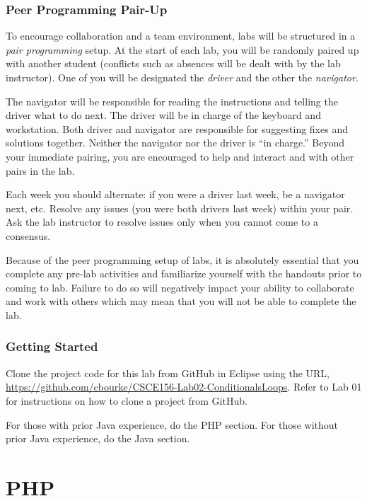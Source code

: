 \documentclass[12pt]{scrartcl}
\begin{document}
\section*{Peer Programming Pair-Up}

To encourage collaboration and a team environment, labs will be
structured in a \emph{pair programming} setup.  At the start of
each lab, you will be randomly paired up with another student 
(conflicts such as absences will be dealt with by the lab instructor).
One of you will be designated the \emph{driver} and the other
the \emph{navigator}.  

The navigator will be responsible for reading the instructions and
telling the driver what to do next.  The driver will be in charge of the
keyboard and workstation.  Both driver and navigator are responsible
for suggesting fixes and solutions together.  Neither the navigator
nor the driver is ``in charge.''  Beyond your immediate pairing, you
are encouraged to help and interact and with other pairs in the lab.

Each week you should alternate: if you were a driver last week, 
be a navigator next, etc.  Resolve any issues (you were both drivers
last week) within your pair.  Ask the lab instructor to resolve issues
only when you cannot come to a consensus.  

Because of the peer programming setup of labs, it is absolutely 
essential that you complete any pre-lab activities and familiarize
yourself with the handouts prior to coming to lab.  Failure to do
so will negatively impact your ability to collaborate and work with 
others which may mean that you will not be able to complete the
lab.  

\section*{Getting Started}

Clone the project code for this lab from GitHub in Eclipse using the
URL, \url{https://github.com/cbourke/CSCE156-Lab02-ConditionalsLoops}.
Refer to Lab 01 for instructions on how to clone a project from GitHub.

For those with prior Java experience, do the PHP section.  For those
without prior Java experience, do the Java section.

\part*{PHP}
\end{document}
